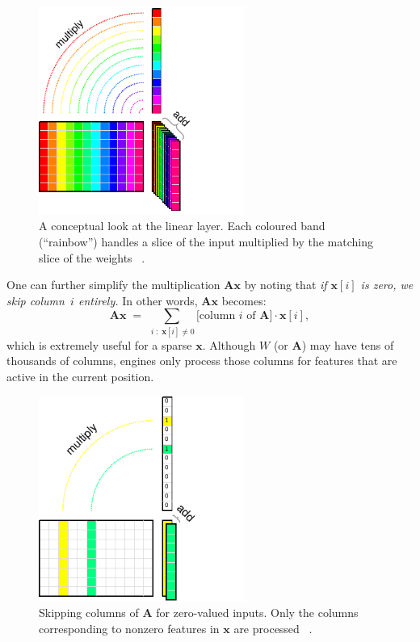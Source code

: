\documentclass[12pt,a4paper]{article}
\begin{document}
\begin{figure}[H]
    \centering
    \includegraphics[width=0.6\textwidth]{figures/mv.pdf}
    \caption{A conceptual look at the linear layer. Each coloured band (“rainbow”) 
    handles a slice of the input multiplied by the matching slice of the weights ~\cite{githubdocs}.}
    \label{fig:mv}
\end{figure}
One can further simplify the multiplication \(\mathbf{A}\mathbf{x}\) by noting that
\emph{if \(\mathbf{x}[i]\) is zero, we skip column~\(i\) entirely.} 
In other words, \(\mathbf{A}\mathbf{x}\) becomes:
\[
\mathbf{A}\mathbf{x} \;=\; \sum_{\,i\;:\;\mathbf{x}[i]\neq0} 
   \bigl[\text{column } i\text{ of }\mathbf{A}\bigr] \cdot \mathbf{x}[i],
\]
which is extremely useful for a sparse \(\mathbf{x}\). 
Although \(W\) (or \(\mathbf{A}\)) may have tens of thousands of columns, 
engines only process those columns for features that are active in the current position.
\begin{figure}[H]
    \centering
    \includegraphics[width=0.6\textwidth]{figures/mvs.pdf}
    \caption{Skipping columns of \(\mathbf{A}\) for zero-valued inputs. 
    Only the columns corresponding to nonzero features in \(\mathbf{x}\) are processed ~\cite{githubdocs}.}
    \label{fig:skipcol}
\end{figure}
\end{document}
